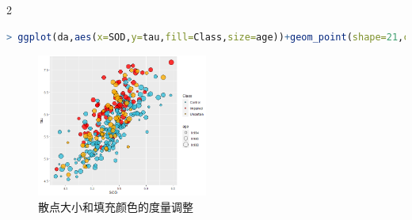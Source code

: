\documentclass[11pt,a4paper,oneside]{book}
\begin{document}
\begin{multicols}{2}
\begin{lstlisting}[language=r]
> ggplot(da,aes(x=SOD,y=tau,fill=Class,size=age))+geom_point(shape=21,color="black",stroke=0.25,alpha=0.8)+scale_fill_manual(values = c("#36BED9","#FF0000","#FBAD01"))+scale_size(range=c(1,8))
\end{lstlisting}
\begin{figure}[H]
	\centering
	\includegraphics[width=0.5\textwidth]{screenshot024}
	\caption{散点大小和填充颜色的度量调整}
	\label{fig:screenshot024}
\end{figure}
\end{multicols}
\end{document}
